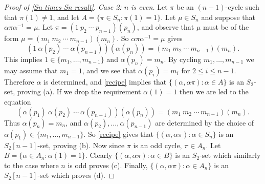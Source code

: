 \documentclass[12pt]{article}
\begin{document}
\begin{proof}[Proof of \autoref{Sn times Sn result}]
    \textit{Case 2: $n$ is even.} Let $\pi$ be an $(n-1)$-cycle such that $\pi(1)\ne 1$, and let $A=\{\pi\in S_n:\pi(1)=1\}$. Let $\mu\in S_n$ and suppose that $\alpha\pi\alpha^{-1}=\mu$. Let $\pi=(1\ p_2\ \cdots\ p_{n-1})(p_n)$, and observe that $\mu$ must be of the form $\mu=(m_1\ m_2\  \cdots\ m_{n-1})(m_n)$. So $\alpha\pi\alpha^{-1}=\mu$ gives
    $$(1\ \alpha(p_2)\ \cdots\ \alpha(p_{n-1}))(\alpha(p_n))=(m_1\ m_2\ \cdots\ m_{n-1})(m_n).$$
    This implies $1\in\{m_1,\ldots,m_{n-1}\}$ and $\alpha(p_n)=m_n$. By cycling $m_1,\ldots,m_{n-1}$ we may assume that $m_1=1$, and we see that $\alpha(p_i)=m_i$ for $2\le i\le n-1$. Therefore $\alpha$ is determined, and \autoref{recipe} implies that $\{(\alpha,\alpha\pi):\alpha\in A\}$ is an $S_2$-set, proving (a). If we drop the requirement $\alpha(1)=1$ then we are led to the equation
    $$(\alpha(p_1)\ \alpha(p_2)\ \cdots\ \alpha(p_{n-1}))(\alpha(p_n))=(m_1\ m_2\ \cdots\ m_{n-1})(m_n).$$
    Thus $\alpha(p_n)=m_n$, and $\alpha(p_2),\ldots,\alpha(p_{n-1})$ are determined by the choice of $\alpha(p_1)\in\{m_1,\ldots,m_{n-1}\}$. So \autoref{recipe} gives that $\{(\alpha,\alpha\pi):\alpha\in S_n\}$ is an $S_2[n-1]$-set, proving (b). Now since $\pi$ is an odd cycle, $\pi\in A_n$. Let $B=\{\alpha\in A_n:\alpha(1)=1\}$. Clearly $\{(\alpha,\alpha\pi):\alpha\in B\}$ is an $S_2$-set which similarly to the case where $n$ is odd proves (c). Finally, $\{(\alpha,\alpha\pi):\alpha\in A_n\}$ is an $S_2[n-1]$-set which proves (d).
\end{proof}
\end{document}
